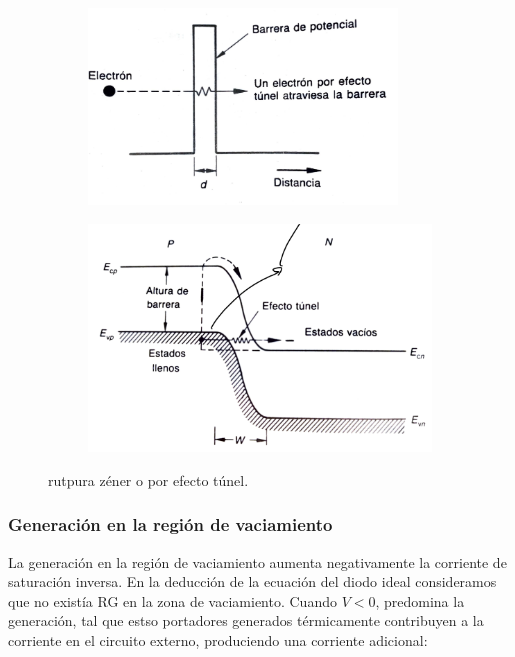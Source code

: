 \begin{figure}[h!]
    \centering
    \begin{subfigure}{0.47\textwidth}
        \includegraphics[width=0.9\textwidth]{Cuerpo/Ch_03/03_Temario_09.png}
    \end{subfigure}
    \begin{subfigure}{0.47\textwidth}
        \includegraphics[width=\textwidth]{Cuerpo/Ch_03/03_Temario_08.png}
    \end{subfigure}
    \caption{rutpura zéner o por efecto túnel.}
\end{figure}

\subsubsection{Generación en la región de vaciamiento}


La generación en la región de vaciamiento aumenta negativamente la corriente de saturación inversa. En la deducción de la ecuación del diodo ideal consideramos que no existía RG en la zona de vaciamiento. Cuando $V<0$, predomina la generación, tal que estso portadores generados térmicamente contribuyen a la corriente en el circuito externo, produciendo una corriente adicional: 

